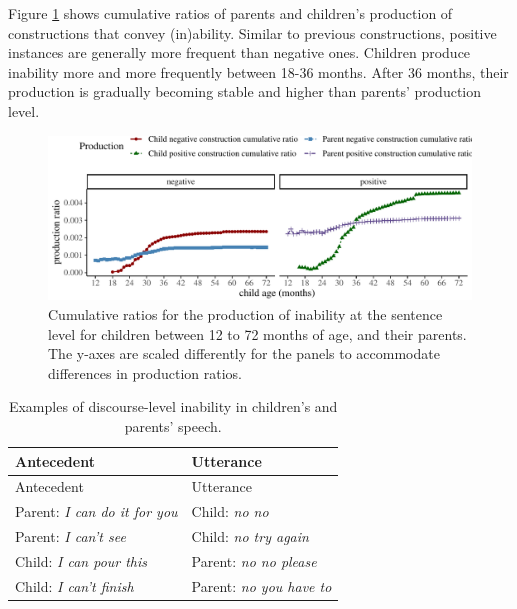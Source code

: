 \documentclass[
  english,
  man,floatsintext]{apa6}
\begin{document}
Figure \ref{fig:inability} shows cumulative ratios of parents and children's production of constructions that convey (in)ability. Similar to previous constructions, positive instances are generally more frequent than negative ones. Children produce inability more and more frequently between 18-36 months. After 36 months, their production is gradually becoming stable and higher than parents' production level.

\begin{figure}[H]

{\centering \includegraphics{neg_construction_article_files/figure-latex/inability-1} 

}

\caption{Cumulative ratios for the production of inability at the sentence level for children between 12 to 72 months of age, and their parents. The y-axes are scaled differently for the panels to accommodate differences in production ratios.}\label{fig:inability}
\end{figure}

\begin{longtable}[]{@{}ll@{}}
\caption{\label{tab:disinability} Examples of discourse-level inability in children's and parents' speech.}\tabularnewline
\toprule
Antecedent & Utterance \\
\midrule
\endfirsthead
\toprule
Antecedent & Utterance \\
\midrule
\endhead
Parent: \emph{I can do it for you} & Child: \emph{no no} \\
Parent: \emph{I can't see} & Child: \emph{no try again} \\
Child: \emph{I can pour this} & Parent: \emph{no no please} \\
Child: \emph{I can't finish} & Parent: \emph{no you have to} \\
\bottomrule
\end{longtable}
\end{document}
